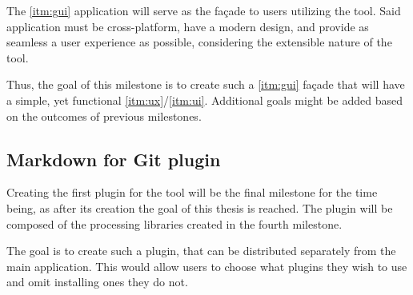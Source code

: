 The \ref{itm:gui} application will serve as the façade to users utilizing the tool. Said application must be cross-platform, have a modern design, and provide as seamless a user experience as possible, considering the extensible nature of the tool.

Thus, the goal of this milestone is to create such a \ref{itm:gui} façade that will have a simple, yet functional \ref{itm:ux}/\ref{itm:ui}. Additional goals might be added based on the outcomes of previous milestones.

\subsection*{Markdown for Git plugin} \label{subSecMdGitPlugin}

Creating the first plugin for the tool will be the final milestone for the time being, as after its creation the goal of this thesis is reached.
The plugin will be composed of the processing libraries created in the fourth milestone.

The goal is to create such a plugin, that can be distributed separately from the main application. This would allow users to choose what plugins they wish to use and omit installing ones they do not.
